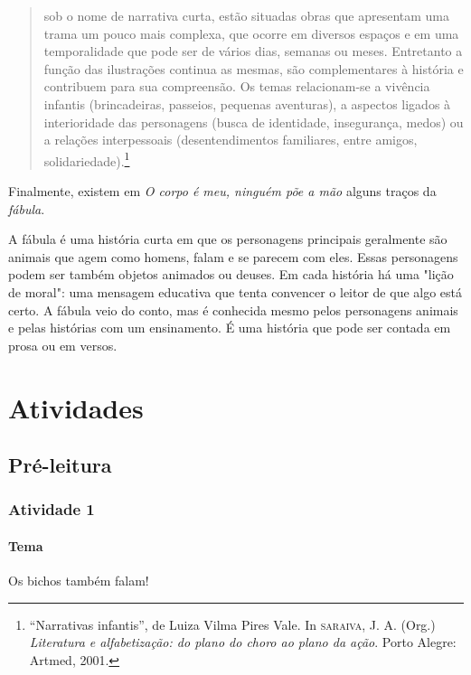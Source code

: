 \documentclass[11pt]{extarticle}
\begin{document}
\begin{quote}
sob o nome de narrativa curta, estão situadas obras que apresentam uma trama 
um pouco mais complexa, que ocorre em diversos espaços e em uma temporalidade 
que pode ser de vários dias, semanas ou meses. Entretanto a função das ilustrações 
continua as mesmas, são complementares à história e contribuem para sua compreensão. 
Os temas relacionam-se a vivência infantis (brincadeiras, passeios, pequenas aventuras), 
a aspectos ligados à interioridade das personagens (busca de identidade, insegurança, 
medos) ou a relações interpessoais (desentendimentos familiares, entre amigos, solidariedade).\footnote{“Narrativas infantis”, de Luiza Vilma Pires Vale. In \textsc{saraiva}, J. A. (Org.) \textit{Literatura e alfabetização: do plano do choro ao plano da ação}. Porto Alegre: Artmed, 2001.} 
\end{quote}

Finalmente, existem em \textit{O corpo é meu, ninguém põe a mão} alguns traços da \textit{fábula}. 

A fábula é uma história curta em que os personagens principais
geralmente são animais que agem como homens, falam e se parecem com eles.
Essas personagens podem ser também objetos animados ou deuses. Em cada
história há uma "lição de moral": uma mensagem educativa que
tenta convencer o leitor de que algo está certo. A fábula veio do conto, mas
é conhecida mesmo pelos personagens animais e pelas histórias com um ensinamento. 
É uma história que pode ser contada em prosa ou em versos.


\section{Atividades}

\subsection{Pré-leitura}


\subsubsection{Atividade 1}

\paragraph{Tema} Os bichos também falam!
\end{document}
